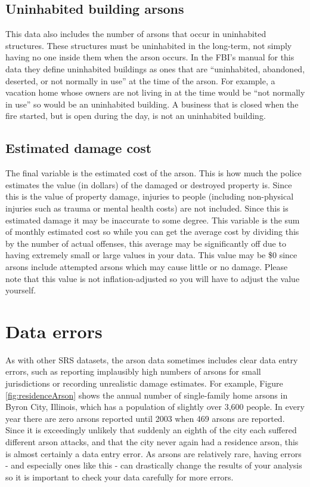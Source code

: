 \documentclass[
]{krantz}
\begin{document}
\subsection{Uninhabited building
arsons}\label{uninhabited-building-arsons}

This data also includes the number of arsons that occur in
uninhabited structures. These structures must be uninhabited
in the long-term, not simply having no one inside them when
the arson occurs. In the FBI's manual for this data they
define uninhabited buildings as ones that are ``uninhabited,
abandoned, deserted, or not normally in use'' at the time of
the arson. For example, a vacation home whose owners are not
living in at the time would be ``not normally in use'' so
would be an uninhabited building. A business that is closed
when the fire started, but is open during the day, is not an
uninhabited building.

\subsection{Estimated damage
cost}\label{estimated-damage-cost}

The final variable is the estimated cost of the arson. This
is how much the police estimates the value (in dollars) of
the damaged or destroyed property is. Since this is the
value of property damage, injuries to people (including
non-physical injuries such as trauma or mental health costs)
are not included. Since this is estimated damage it may be
inaccurate to some degree. This variable is the sum of
monthly estimated cost so while you can get the average cost
by dividing this by the number of actual offenses, this
average may be significantly off due to having extremely
small or large values in your data. This value may be \$0
since arsons include attempted arsons which may cause little
or no damage. Please note that this value is not
inflation-adjusted so you will have to adjust the value
yourself.

\section{Data errors}\label{data-errors-1}

As with other SRS datasets, the arson data sometimes
includes clear data entry errors, such as reporting
implausibly high numbers of arsons for small jurisdictions
or recording unrealistic damage estimates. For example,
Figure \ref{fig:residenceArson} shows the annual number of
single-family home arsons in Byron City, Illinois, which has
a population of slightly over 3,600 people. In every year
there are zero arsons reported until 2003 when 469 arsons
are reported. Since it is exceedingly unlikely that suddenly
an eighth of the city each suffered different arson attacks,
and that the city never again had a residence arson, this is
almost certainly a data entry error. As arsons are
relatively rare, having errors - and especially ones like
this - can drastically change the results of your analysis
so it is important to check your data carefully for more
errors.
\end{document}
